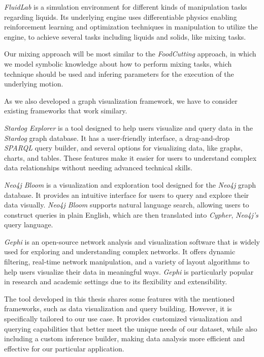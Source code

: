 \textit{FluidLab}\cite{xian2023fluidlab} is a simulation environment for different kinds of manipulation tasks regarding liquids. Its underlying engine uses differentiable physics 
enabling reinforcement learning and optimization techniques in manipulation to utilize the engine, to achieve several tasks 
including liquids and solids, like mixing tasks. 

Our mixing approach will be most similar to the \textit{FoodCutting} approach, in which we model symbolic knowledge about how to perform
mixing tasks, which technique should be used and infering parameters for the execution of the underlying motion.

As we also developed a graph visualization framework, we have to consider existing frameworks that work similary.

\textit{Stardog Explorer}\cite{StardogExplorer} is a tool designed to help users visualize and query data in the \textit{Stardog} graph database. It has a user-friendly interface, a drag-and-drop \textit{SPARQL} query builder, and several options for visualizing data, like graphs, charts, and tables. These features make it easier for users to understand complex data relationships without needing advanced technical skills.

\textit{Neo4j Bloom}\cite{neo4j} is a visualization and exploration tool designed for the \textit{Neo4j} graph database. It provides an intuitive interface for users to query and explore their data visually. \textit{Neo4j Bloom}\cite{neo4j} supports natural language search, allowing users to construct queries in plain English, which are then translated into \textit{Cypher}, \textit{Neo4j's} query language.

\textit{Gephi}\cite{gephi} is an open-source network analysis and visualization software that is widely used for exploring and understanding complex networks. It offers dynamic filtering, real-time network manipulation, and a variety of layout algorithms to help users visualize their data in meaningful ways. \textit{Gephi} \cite{gephi} is particularly popular in research and academic settings due to its flexibility and extensibility.

The tool developed in this thesis shares some features with the mentioned frameworks, such as data visualization and query building. However, it is specifically tailored to our use case. It provides customized visualization and querying capabilities that better meet the unique needs of our dataset, while also including a custom inference builder, making data analysis more efficient and effective for our particular application.
